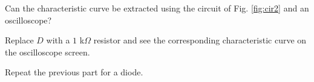 \documentclass[11pt]{article}
\begin{document}
\begin{question}
\begin{subquestion}{Can the characteristic curve be extracted using the circuit of Fig. \ref{fig:cir2} and an oscilloscope? } 
\answer{}
\end{subquestion}

\begin{subquestion}{Replace $D$ with a $1$ k$\Omega$ resistor and see the corresponding characteristic curve on the oscilloscope screen.} 
\answer{}
\end{subquestion}

\begin{subquestion}{Repeat the previous part for a diode.} 
\answer{}
\end{subquestion}


\end{question}

\end{document}
